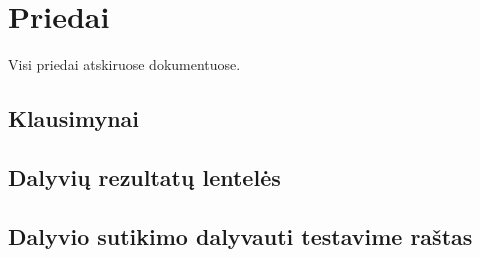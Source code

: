 \documentclass{VUMIFPSkursinis}
\begin{document}
\section{Priedai}
Visi priedai atskiruose dokumentuose.
\subsection{Klausimynai}
\subsection{Dalyvių rezultatų lentelės}
\subsection{Dalyvio sutikimo dalyvauti testavime raštas}


\printbibliography[heading=bibintoc, title=Šaltiniai]  %
\end{document}
